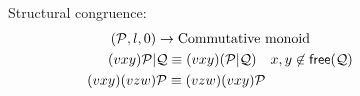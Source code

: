 \begin{figure}[h!]
  Structural congruence:
    \begin{align*}
      (\mathcal{P}, l, 0) &\rightarrow \text{Commutative monoid}\\
      (vxy)\mathcal{P}|&\mathcal{Q}\equiv(vxy)(\mathcal{P}|\mathcal{Q})\quad x, y \not\in \mathsf{free}(\mathcal{Q})\\
      (vxy)(vzw)&\mathcal{P}\equiv(vzw)(vxy)\mathcal{P}
    \end{align*}
\end{figure}


